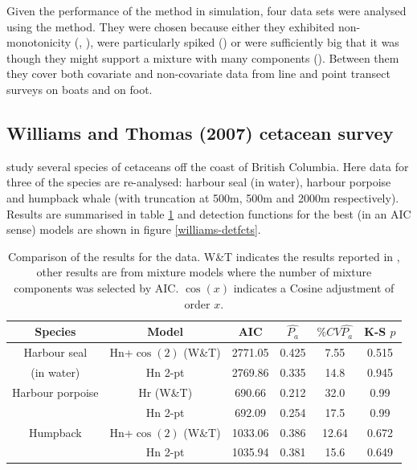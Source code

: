 Given the performance of the method in simulation, four data sets were analysed using the method. They were chosen because either they exhibited non-monotonicity (\cite{williams}, \cite{pike}), were particularly spiked (\cite{ants}) or were sufficiently big that it was though they might support a mixture with many components (\cite{amakihi}). Between them they cover both covariate and non-covariate data from line and point transect surveys on boats and on foot.

\subsection{Williams and Thomas (2007) cetacean survey}

 study several species of cetaceans off the coast of British Columbia. Here data for three of the species are re-analysed: harbour seal (in water), harbour porpoise and humpback whale (with truncation at 500m, 500m and 2000m respectively). Results are summarised in table \ref{williams-table} and detection functions for the best (in an AIC sense) models are shown in figure \ref{williams-detfcts}.

\begin{table}
\centering
\begin{tabular}{c c c c c c}
Species & Model & AIC & $\hat{P_a}$ & $\% CV \hat{P_a}$ & K-S $p$\\
\hline
Harbour seal & Hn+$\cos(2)$ (W\&T) & 2771.05 & 0.425 & 7.55 & 0.515\\
(in water) & Hn 2-pt  & 2769.86 & 0.335 & 14.8 & 0.945\\
Harbour porpoise & Hr (W\&T) & 690.66 & 0.212 & 32.0 & 0.99\\
 & Hn 2-pt & 692.09 & 0.254 & 17.5 & 0.99\\
Humpback & Hn+$\cos(2)$ (W\&T) & 1033.06 & 0.386 & 12.64 & 0.672 \\
 & Hn 2-pt & 1035.94 & 0.381 & 15.6 & 0.649 \\
\end{tabular}
\caption{Comparison of the results for the  data. W\&T indicates the results reported in , other results are from mixture models where the number of mixture components was selected by AIC. $\cos(x)$ indicates a Cosine adjustment of order $x$.}
\label{williams-table}
\end{table}

